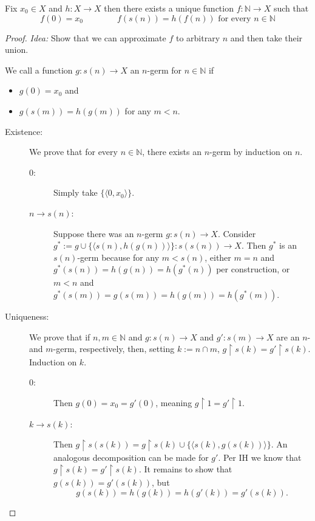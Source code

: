 \documentclass{whrartcl}
\newcommand{\NN}{\mathbb{N}}
\newcommand{\uh}{\upharpoonright}
\begin{document}
\begin{theorem}[Recursion]
  Fix $x_0 \in X$ and $h : X \to X$ then there exists a unique function $f :
  \NN \to X$ such that
  \[
    f(0) = x_0 \qquad \qquad f(s(n)) = h(f(n)) \text{ for every } n \in \NN
  \]
\end{theorem}
\begin{proof}
  \emph{Idea:} Show that we can approximate $f$ to arbitrary $n$ and then take
  their union.

  We call a function $g : s(n) \to X$ an $n$-germ for $n \in \NN$ if
  \begin{itemize}
  \item $g(0) = x_0$ and
  \item $g(s(m)) = h(g(m))$ for any $m < n$.
  \end{itemize}

  \begin{description}
  \item[Existence:] We prove that for every $n \in \NN$, there exists an
    $n$-germ by induction on $n$.
    \begin{description}
    \item[$0$:] Simply take $\{\langle 0, x_0 \rangle\}$.
    \item[$n \to s(n)$:] Suppose there was an $n$-germ $g : s(n) \to X$.
      Consider $g^* := g \cup \{\langle s(n), h(g(n)) \rangle\} : s(s(n)) \to X$. Then $g^*$ is
      an $s(n)$-germ because for any $m < s(n)$, either $m = n$ and $g^*(s(n)) =
      h(g(n)) = h(g^*(n))$ per construction, or $m < n$ and $g^*(s(m)) = g(s(m))
      = h(g(m)) = h(g^*(m))$.
    \end{description}
  \item[Uniqueness:] We prove that if $n, m \in \NN$ and $g : s(n) \to X$ and $g'
    : s(m) \to X$ are an $n$- and $m$-germ, respectively, then, setting $k :=
    n \cap m$, $g \uh s(k) = g' \uh s(k)$. Induction on $k$.
    \begin{description}
    \item[$0$:] Then $g(0) = x_0 = g'(0)$, meaning $g \uh 1 = g' \uh 1$.
    \item[$k \to s(k)$:] Then $g \uh s(s(k)) = g \uh s(k) \cup \{\langle s(k),
      g(s(k)) \rangle\}$. An analogous decomposition can be made for $g'$. Per
      IH we know that $g \uh s(k) = g' \uh s(k)$. It remains to show that
      $g(s(k)) = g'(s(k))$, but
      \[
        g(s(k)) = h(g(k)) = h(g'(k)) = g'(s(k)).
      \]
    \end{description}
  \end{description}


\end{proof}
\end{document}
